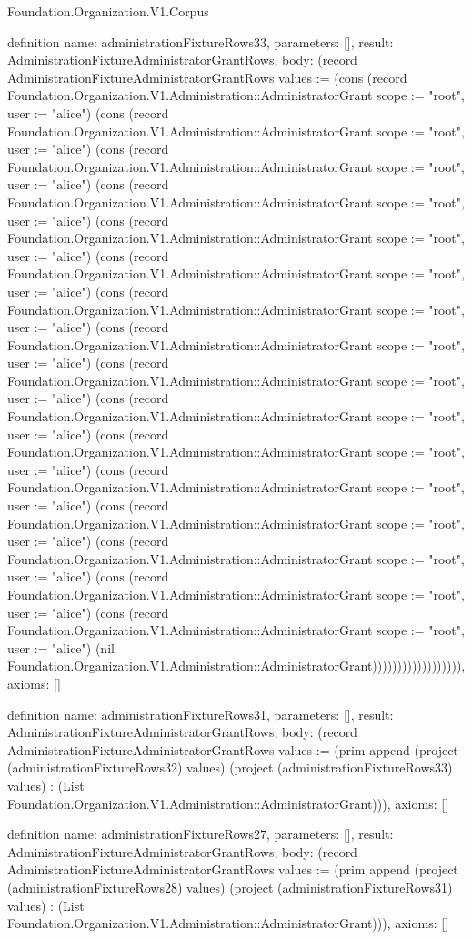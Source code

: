 \begin{lexlean}{Foundation.Organization.V1.Corpus}
\begin{semanticmodule}
definition{
  name: administrationFixtureRows33,
  parameters: [],
  result: AdministrationFixtureAdministratorGrantRows,
  body: (record AdministrationFixtureAdministratorGrantRows {values := (cons (record Foundation.Organization.V1.Administration::AdministratorGrant {scope := "root", user := "alice"}) (cons (record Foundation.Organization.V1.Administration::AdministratorGrant {scope := "root", user := "alice"}) (cons (record Foundation.Organization.V1.Administration::AdministratorGrant {scope := "root", user := "alice"}) (cons (record Foundation.Organization.V1.Administration::AdministratorGrant {scope := "root", user := "alice"}) (cons (record Foundation.Organization.V1.Administration::AdministratorGrant {scope := "root", user := "alice"}) (cons (record Foundation.Organization.V1.Administration::AdministratorGrant {scope := "root", user := "alice"}) (cons (record Foundation.Organization.V1.Administration::AdministratorGrant {scope := "root", user := "alice"}) (cons (record Foundation.Organization.V1.Administration::AdministratorGrant {scope := "root", user := "alice"}) (cons (record Foundation.Organization.V1.Administration::AdministratorGrant {scope := "root", user := "alice"}) (cons (record Foundation.Organization.V1.Administration::AdministratorGrant {scope := "root", user := "alice"}) (cons (record Foundation.Organization.V1.Administration::AdministratorGrant {scope := "root", user := "alice"}) (cons (record Foundation.Organization.V1.Administration::AdministratorGrant {scope := "root", user := "alice"}) (cons (record Foundation.Organization.V1.Administration::AdministratorGrant {scope := "root", user := "alice"}) (cons (record Foundation.Organization.V1.Administration::AdministratorGrant {scope := "root", user := "alice"}) (cons (record Foundation.Organization.V1.Administration::AdministratorGrant {scope := "root", user := "alice"}) (cons (record Foundation.Organization.V1.Administration::AdministratorGrant {scope := "root", user := "alice"}) (nil Foundation.Organization.V1.Administration::AdministratorGrant)))))))))))))))))}),
  axioms: []
}

definition{
  name: administrationFixtureRows31,
  parameters: [],
  result: AdministrationFixtureAdministratorGrantRows,
  body: (record AdministrationFixtureAdministratorGrantRows {values := (prim append (project (administrationFixtureRows32) values) (project (administrationFixtureRows33) values) : (List Foundation.Organization.V1.Administration::AdministratorGrant))}),
  axioms: []
}

definition{
  name: administrationFixtureRows27,
  parameters: [],
  result: AdministrationFixtureAdministratorGrantRows,
  body: (record AdministrationFixtureAdministratorGrantRows {values := (prim append (project (administrationFixtureRows28) values) (project (administrationFixtureRows31) values) : (List Foundation.Organization.V1.Administration::AdministratorGrant))}),
  axioms: []
}


\end{semanticmodule}
\end{lexlean}
